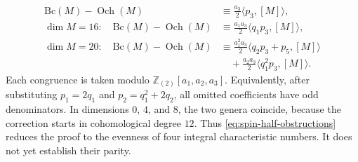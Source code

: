 \documentclass[14pt,dvipsnames]{extarticle}
\makeatletter
\numberwithin{equation}{subsection}
\theoremstyle{plain}
\theoremstyle{definition}
\theoremstyle{definition}
\renewenvironment{proof}[1][\proofname]{
 \par\pushQED{\qed}\normalfont
 \topsep6\p@\@plus6\p@\relax
 \trivlist\item[\hskip\labelsep\bfseries\itshape #1\@addpunct{.}]
}{\popQED\endtrivlist\@endpefalse}
\DeclareMathOperator{\Och}{Och}
\newcommand{\Bc}{\mathrm{Bc}}
\newcommand{\Ztwo}{\mathbb{Z}_{(2)}}
\makeatother
\begin{document}
\begin{proof}[Proof of \cref{thm:bc-spin-below24}]
\begin{equation}
\begin{aligned}
 \Bc(M)-\Och(M)
 &\equiv\frac{a_3}{2}\langle p_3,[M]\rangle,\\
 \dim M=16:\quad
 \Bc(M)-\Och(M)
 &\equiv\frac{a_1a_3}{2}\langle q_1p_3,[M]\rangle,\\
 \dim M=20:\quad
 \Bc(M)-\Och(M)
 &\equiv\frac{a_1^2a_3}{2}\langle q_2p_3+p_5,[M]\rangle\\
 &\quad+\frac{a_2a_3}{2}\langle q_1^2p_3,[M]\rangle.
\end{aligned}
\end{equation}
Each congruence is taken modulo $\Ztwo[a_1,a_2,a_3]$. Equivalently, after substituting
$p_1=2q_1$ and $p_2=q_1^2+2q_2$, all omitted coefficients have odd
denominators. In dimensions $0$, $4$, and $8$, the two genera coincide,
because the correction starts in cohomological degree $12$.
Thus \eqref{eq:spin-half-obstructions} reduces the proof to the evenness of
four integral characteristic numbers. It does not yet establish their
parity.


\end{proof}
\end{document}
